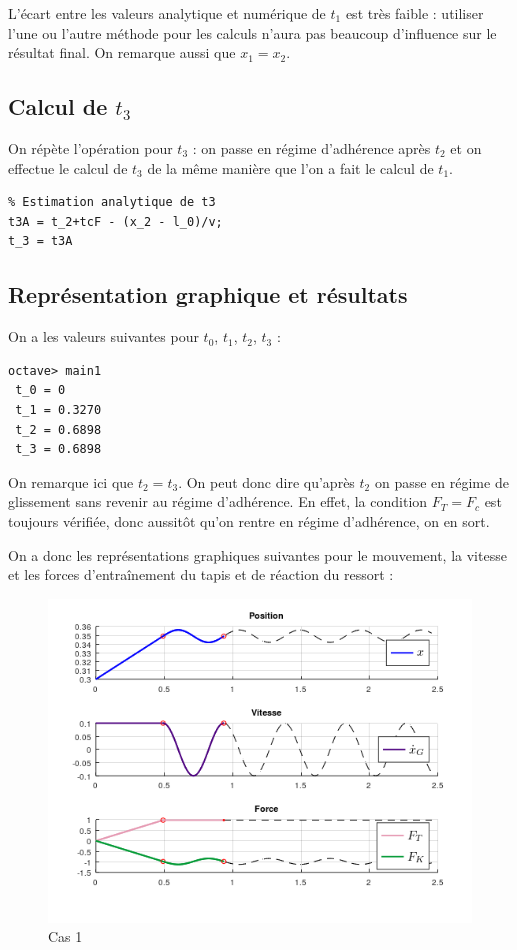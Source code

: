 \documentclass{article}
\newcommand{\ts}{\scriptscriptstyle}
\begin{document}
L'écart entre les valeurs analytique et numérique de $t_1$ est très faible : utiliser l'une ou l'autre méthode pour les calculs n'aura pas beaucoup d'influence sur le résultat final. On remarque aussi que $x_1=x_2$.

\subsection{Calcul de $t_3$}
On répète l'opération pour $t_3$ : on passe en régime d'adhérence après $t_2$ et on effectue le calcul de $t_3$  de la même manière que l'on a fait le calcul de $t_1$. 
\begin{lstlisting}
% Estimation analytique de t3
t3A = t_2+tcF - (x_2 - l_0)/v;
t_3 = t3A
\end{lstlisting}
 
\subsection{Représentation graphique et résultats}
On a les valeurs suivantes pour $t_0$, $t_1$, $t_2$, $t_3$ :
\begin{lstlisting}
octave> main1
 t_0 = 0
 t_1 = 0.3270
 t_2 = 0.6898
 t_3 = 0.6898
\end{lstlisting}

On remarque ici que $t_2 = t_3$. On peut donc dire qu'après $t_2$ on passe en régime de glissement sans revenir au régime d'adhérence. En effet, la condition $F_{\ts{T}} = F_c$ est toujours vérifiée, donc aussitôt qu'on rentre en régime d'adhérence, on en sort.

On a donc les représentations graphiques suivantes pour le mouvement, la vitesse et les forces d'entraînement du tapis et de réaction du ressort : 

\begin{figure}[h!]
	\centering
	\includegraphics[scale=.6]{CAS1.png}
	\caption{Cas 1}
\end{figure}
\end{document}
